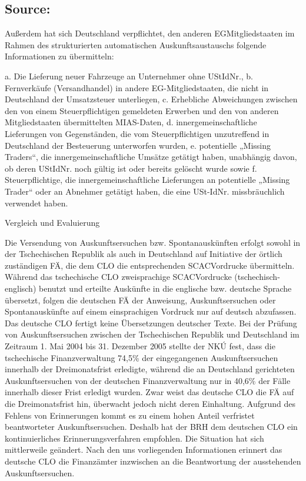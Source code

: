 \documentclass[10pt]{article}
\begin{document}
\subsection*{Source:}



Außerdem hat sich Deutschland verpﬂichtet, den anderen EGMitgliedstaaten im Rahmen des strukturierten automatischen Auskunftsaustauschs folgende Informationen zu übermitteln:

a. Die Lieferung neuer Fahrzeuge an Unternehmer ohne UStIdNr., b. Fernverkäufe (Versandhandel) in andere EG-Mitgliedstaaten, die nicht in Deutschland der Umsatzsteuer unterliegen, c. Erhebliche Abweichungen zwischen den von einem Steuerpﬂichtigen gemeldeten Erwerben und den von anderen Mitgliedstaaten übermittelten MIAS-Daten, d. innergemeinschaftliche Lieferungen von Gegenständen, die vom Steuerpﬂichtigen unzutreffend in Deutschland der Besteuerung unterworfen wurden, e. potentielle „Missing Traders“, die innergemeinschaftliche Umsätze getätigt haben, unabhängig davon, ob deren UStIdNr. noch gültig ist oder bereits gelöscht wurde sowie f. Steuerpﬂichtige, die innergemeinschaftliche Lieferungen an potentielle „Missing Trader“ oder an Abnehmer getätigt haben, die eine USt-IdNr. missbräuchlich verwendet haben.


Vergleich und Evaluierung

Die Versendung von Auskunftsersuchen bzw. Spontanauskünften erfolgt sowohl in der Tschechischen Republik als auch in Deutschland auf Initiative der örtlich zuständigen FÄ, die dem CLO die entsprechenden SCACVordrucke übermitteln.
Während das tschechische CLO zweisprachige SCACVordrucke (tschechisch-englisch) benutzt und erteilte Auskünfte in die englische bzw. deutsche Sprache übersetzt, folgen die deutschen FÄ der Anweisung, Auskunftsersuchen oder Spontanauskünfte auf einem einsprachigen Vordruck nur auf deutsch abzufassen.
Das deutsche CLO fertigt keine Übersetzungen deutscher Texte.
Bei der Prüfung von Auskunftsersuchen zwischen der Tschechischen Republik und Deutschland im Zeitraum 1. Mai 2004 bis 31. Dezember 2005 stellte der NKÚ fest, dass die tschechische Finanzverwaltung 74,5\% der eingegangenen Auskunftsersuchen innerhalb der Dreimonatsfrist erledigte, während die an Deutschland gerichteten Auskunftsersuchen von der deutschen Finanzverwaltung nur in 40,6\% der Fälle innerhalb dieser Frist erledigt wurden.
Zwar weist das deutsche CLO die FÄ auf die Dreimonatsfrist hin, überwacht jedoch nicht deren Einhaltung.
Aufgrund des Fehlens von Erinnerungen kommt es zu einem hohen Anteil verfristet beantworteter Auskunftsersuchen.
Deshalb hat der BRH dem deutschen CLO ein kontinuierliches Erinnerungsverfahren empfohlen.
Die Situation hat sich mittlerweile geändert.
Nach den uns vorliegenden Informationen erinnert das deutsche CLO die Finanzämter inzwischen an die Beantwortung der ausstehenden Auskunftsersuchen.
\end{document}
